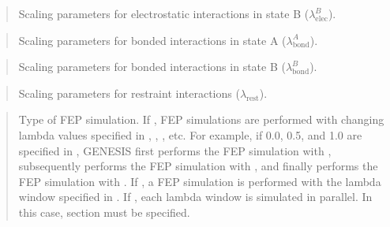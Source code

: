 \documentclass[a4paper,11pt,oneside,english]{sphinxmanual}
\begin{document}
 
\begin{quote}


Scaling parameters for electrostatic interactions in state B (\(\lambda_{\text{elec}}^B\)).
\end{quote}

 
\begin{quote}


Scaling parameters for bonded interactions in state A (\(\lambda_{\text{bond}}^A\)).
\end{quote}

 
\begin{quote}


Scaling parameters for bonded interactions in state B (\(\lambda_{\text{bond}}^B\)).
\end{quote}

 
\begin{quote}


Scaling parameters for restraint interactions (\(\lambda_{\text{rest}}\)).
\end{quote}

 
\begin{quote}


Type of FEP simulation.
If , FEP simulations are performed with changing lambda values specified in , , , etc. For example, if 0.0, 0.5, and 1.0 are specified in , GENESIS first performs the FEP simulation with , subsequently performs the FEP simulation with , and finally performs the FEP simulation with .
If , a FEP simulation is performed with the lambda window specified in .
If , each lambda window is simulated in parallel. In this case, \sphinxstylestrong{{[}REMD{]}} section must be specified.
\end{quote}
\end{document}
